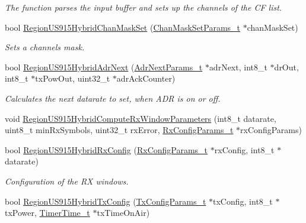\begin{DoxyCompactItemize}
\begin{DoxyCompactList}\small\item\em The function parses the input buffer and sets up the channels of the CF list. \end{DoxyCompactList}\item 
bool \hyperlink{group__REGIONUS915HYB_gab7d8969e0b1037572a6703d7995c44e3}{Region\+U\+S915\+Hybrid\+Chan\+Mask\+Set} (\hyperlink{group__REGION_ga6d24f7da136006410827dfb29f6b9b9e}{Chan\+Mask\+Set\+Params\+\_\+t} $\ast$chan\+Mask\+Set)
\begin{DoxyCompactList}\small\item\em Sets a channels mask. \end{DoxyCompactList}\item 
bool \hyperlink{group__REGIONUS915HYB_ga6cf3188c00bf9a9eaa7c62686dd4b391}{Region\+U\+S915\+Hybrid\+Adr\+Next} (\hyperlink{group__REGION_ga567c2742622326b350b4e91bbf61b4ce}{Adr\+Next\+Params\+\_\+t} $\ast$adr\+Next, int8\+\_\+t $\ast$dr\+Out, int8\+\_\+t $\ast$tx\+Pow\+Out, uint32\+\_\+t $\ast$adr\+Ack\+Counter)
\begin{DoxyCompactList}\small\item\em Calculates the next datarate to set, when A\+DR is on or off. \end{DoxyCompactList}\item 
void \hyperlink{group__REGIONUS915HYB_gaf5cfd5576e5648a2a0bb12a982beb973}{Region\+U\+S915\+Hybrid\+Compute\+Rx\+Window\+Parameters} (int8\+\_\+t datarate, uint8\+\_\+t min\+Rx\+Symbols, uint32\+\_\+t rx\+Error, \hyperlink{group__REGION_ga375c038078dfcfc7ef14280021db719e}{Rx\+Config\+Params\+\_\+t} $\ast$rx\+Config\+Params)
\item 
bool \hyperlink{group__REGIONUS915HYB_ga0f982743b1649a9491067676307a2e75}{Region\+U\+S915\+Hybrid\+Rx\+Config} (\hyperlink{group__REGION_ga375c038078dfcfc7ef14280021db719e}{Rx\+Config\+Params\+\_\+t} $\ast$rx\+Config, int8\+\_\+t $\ast$datarate)
\begin{DoxyCompactList}\small\item\em Configuration of the RX windows. \end{DoxyCompactList}\item 
bool \hyperlink{group__REGIONUS915HYB_gaad87151c4921c1caae24b3b8bb4135b9}{Region\+U\+S915\+Hybrid\+Tx\+Config} (\hyperlink{group__REGION_gabed730d4d04b0b60d4b6d1966d3f21d3}{Tx\+Config\+Params\+\_\+t} $\ast$tx\+Config, int8\+\_\+t $\ast$tx\+Power, \hyperlink{utilities_8h_a4215ca43d3e953099ea758ce428599d0}{Timer\+Time\+\_\+t} $\ast$tx\+Time\+On\+Air)

\end{DoxyCompactItemize}
